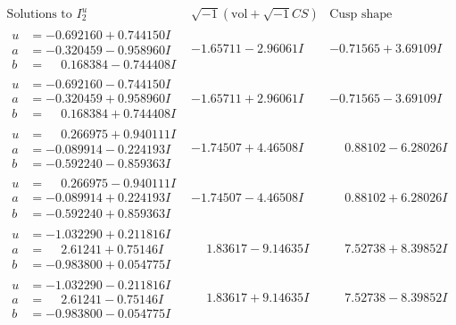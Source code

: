 \documentclass[1p]{elsarticle_modified}
\theoremstyle{definition}
\newcommand{\I}{\sqrt{-1}}
\begin{document}
$$\begin{array}{c|c|c}  
\text{Solutions to }I^u_{2}& \I (\text{vol} + \sqrt{-1}CS) & \text{Cusp shape}\\
 \hline 
\begin{aligned}
u &= -0.692160 + 0.744150 I \\
a &= -0.320459 - 0.958960 I \\
b &= \phantom{-}0.168384 - 0.744408 I\end{aligned}
 & -1.65711 - 2.96061 I & -0.71565 + 3.69109 I \\ \hline\begin{aligned}
u &= -0.692160 - 0.744150 I \\
a &= -0.320459 + 0.958960 I \\
b &= \phantom{-}0.168384 + 0.744408 I\end{aligned}
 & -1.65711 + 2.96061 I & -0.71565 - 3.69109 I \\ \hline\begin{aligned}
u &= \phantom{-}0.266975 + 0.940111 I \\
a &= -0.089914 - 0.224193 I \\
b &= -0.592240 - 0.859363 I\end{aligned}
 & -1.74507 + 4.46508 I & \phantom{-}0.88102 - 6.28026 I \\ \hline\begin{aligned}
u &= \phantom{-}0.266975 - 0.940111 I \\
a &= -0.089914 + 0.224193 I \\
b &= -0.592240 + 0.859363 I\end{aligned}
 & -1.74507 - 4.46508 I & \phantom{-}0.88102 + 6.28026 I \\ \hline\begin{aligned}
u &= -1.032290 + 0.211816 I \\
a &= \phantom{-}2.61241 + 0.75146 I \\
b &= -0.983800 + 0.054775 I\end{aligned}
 & \phantom{-}1.83617 - 9.14635 I & \phantom{-}7.52738 + 8.39852 I \\ \hline\begin{aligned}
u &= -1.032290 - 0.211816 I \\
a &= \phantom{-}2.61241 - 0.75146 I \\
b &= -0.983800 - 0.054775 I\end{aligned}
 & \phantom{-}1.83617 + 9.14635 I & \phantom{-}7.52738 - 8.39852 I \\ \hline\begin{aligned}

\end{aligned}
\end{array}$$
\end{document}

